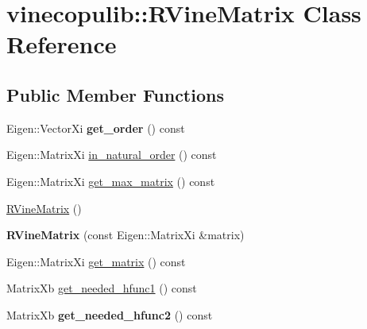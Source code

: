 \hypertarget{classvinecopulib_1_1_r_vine_matrix}{}\section{vinecopulib\+:\+:R\+Vine\+Matrix Class Reference}
\label{classvinecopulib_1_1_r_vine_matrix}
\subsection*{Public Member Functions}
\begin{DoxyCompactItemize}
\item 
Eigen\+::\+Vector\+Xi {\bfseries get\+\_\+order} () const \hypertarget{classvinecopulib_1_1_r_vine_matrix_a8ce7f93504e7c219ca9da89e1d97a34b}{}\label{classvinecopulib_1_1_r_vine_matrix_a8ce7f93504e7c219ca9da89e1d97a34b}

\item 
Eigen\+::\+Matrix\+Xi \hyperlink{classvinecopulib_1_1_r_vine_matrix_a88673df07f4aae0e0e0a65faff2418b6}{in\+\_\+natural\+\_\+order} () const 
\item 
Eigen\+::\+Matrix\+Xi \hyperlink{classvinecopulib_1_1_r_vine_matrix_a674074d4e248868a01155a25f775ae3a}{get\+\_\+max\+\_\+matrix} () const 
\end{DoxyCompactItemize}
{\bf }\par
\begin{DoxyCompactItemize}
\item 
\hyperlink{classvinecopulib_1_1_r_vine_matrix_a657aaae02c7f9bca12b3c43f475ac884}{R\+Vine\+Matrix} ()
\item 
{\bfseries R\+Vine\+Matrix} (const Eigen\+::\+Matrix\+Xi \&matrix)\hypertarget{classvinecopulib_1_1_r_vine_matrix_a5872c479d4a7de9c2ddc64cdb0909ef9}{}\label{classvinecopulib_1_1_r_vine_matrix_a5872c479d4a7de9c2ddc64cdb0909ef9}

\end{DoxyCompactItemize}

{\bf }\par
\begin{DoxyCompactItemize}
\item 
Eigen\+::\+Matrix\+Xi \hyperlink{classvinecopulib_1_1_r_vine_matrix_aef1ea47e9fcbcd32337b2db508b25fdb}{get\+\_\+matrix} () const 
\end{DoxyCompactItemize}

{\bf }\par
\begin{DoxyCompactItemize}
\item 
Matrix\+Xb \hyperlink{classvinecopulib_1_1_r_vine_matrix_a6303fc1f643fdf793c867ca7e08e42bc}{get\+\_\+needed\+\_\+hfunc1} () const 
\item 
Matrix\+Xb {\bfseries get\+\_\+needed\+\_\+hfunc2} () const \hypertarget{classvinecopulib_1_1_r_vine_matrix_a7ac32cf10a966ba567142e9b36106746}{}\label{classvinecopulib_1_1_r_vine_matrix_a7ac32cf10a966ba567142e9b36106746}

\end{DoxyCompactItemize}


